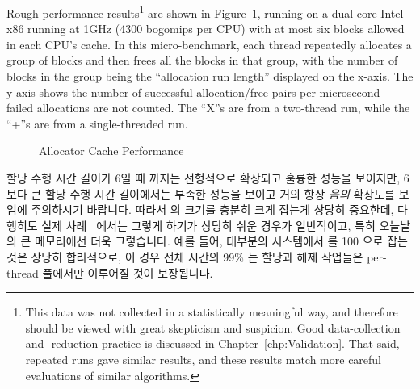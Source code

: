Rough performance results\footnote{
	This data was not collected in a statistically meaningful way,
	and therefore should be viewed with great skepticism and suspicion.
	Good data-collection and -reduction practice is discussed
	in Chapter~\ref{chp:Validation}.
	That said, repeated runs gave similar results, and these results
	match more careful evaluations of similar algorithms.}
are shown in
Figure~\ref{fig:SMPdesign:Allocator Cache Performance},
running on a dual-core Intel x86 running at 1GHz (4300 bogomips per CPU)
with at most six blocks allowed in each CPU's cache.
In this micro-benchmark,
each thread repeatedly allocates a group of blocks and then frees all
the blocks in that group, with
the number of blocks in the group being the ``allocation run length''
displayed on the x-axis.
The y-axis shows the number of successful allocation/free pairs per
microsecond---failed allocations are not counted.
The ``X''s are from a two-thread run, while the ``+''s are from a
single-threaded run.
\fi

\begin{figure}[tbp]
\centering
{}
\caption{Allocator Cache Performance}
\label{fig:SMPdesign:Allocator Cache Performance}
\end{figure}

할당 수행 시간 길이가 6일 때 까지는 선형적으로 확장되고 훌륭한 성능을 보이지만,
6보다 큰 할당 수행 시간 길이에서는 부족한 성능을 보이고 거의 항상 \emph{음의}
확장도를 보임에 주의하시기 바랍니다.
따라서  의 크기를 충분히 크게 잡는게 상당히 중요한데,
다행히도 실제 사례~\cite{McKenney01e} 에서는 그렇게 하기가 상당히 쉬운 경우가
일반적이고, 특히 오늘날의 큰 메모리에선 더욱 그렇습니다.
예를 들어, 대부분의 시스템에서  를 100 으로 잡는 것은
상당히 합리적으로, 이 경우 전체 시간의 99\% 는 할당과 해제 작업들은 per-thread
풀에서만 이루어질 것이 보장됩니다.

